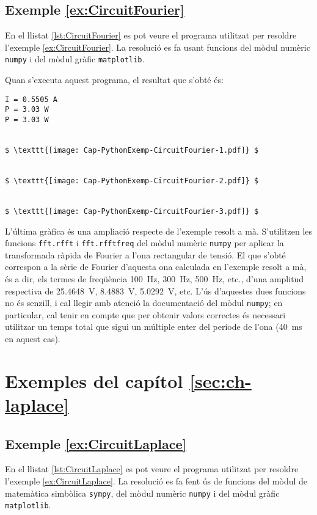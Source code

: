 \hypertarget{exemple:CircuitFourier}{\subsection{Exemple \ref*{ex:CircuitFourier} \CircuitFourier}}
En el llistat \vref{lst:CircuitFourier} es pot veure el programa utilitzat per resoldre l'exemple \vref{ex:CircuitFourier}. La resolució es fa usant funcions del mòdul numèric \texttt{numpy} i del mòdul gràfic  \texttt{matplotlib}.


Quan s'executa aquest programa, el resultat que s'obté és:
\lstset{
	language=,
	numbers=none,
	frame=none
}
\begin{lstlisting}[mathescape=true]
I = 0.5505 A
P = 3.03 W
P = 3.03 W


$ \texttt{[image: Cap-PythonExemp-CircuitFourier-1.pdf]} $


$ \texttt{[image: Cap-PythonExemp-CircuitFourier-2.pdf]} $


$ \texttt{[image: Cap-PythonExemp-CircuitFourier-3.pdf]} $
\end{lstlisting} 

L'última gràfica és una ampliació respecte de l'exemple resolt a mà. S'utilitzen les funcions \texttt{fft.rfft} i \texttt{fft.rfftfreq} del mòdul numèric \texttt{numpy} per aplicar la transformada ràpida de Fourier a l'ona rectangular de tensió. El que s'obté correspon a la sèrie de Fourier d'aquesta ona calculada en l'exemple resolt a  mà, és a dir, els termes de freqüència \qty{100}{Hz}, \qty{300}{Hz}, \qty{500}{Hz}, etc., d'una amplitud respectiva de \qty{25,4648}{V}, \qty{8,4883}{V}, \qty{5,0292}{V}, etc. L'ús d'aquestes dues funcions no és senzill, i cal llegir amb atenció la documentació del mòdul \texttt{numpy}; en particular, cal tenir en compte que per obtenir valors correctes és necessari utilitzar un temps total que sigui un múltiple enter del període de l'ona (\qty{40}{ms} en aquest cas).


\section{Exemples del capítol \ref*{sec:ch-laplace}}

\hypertarget{exemple:CircuitLaplace}{\subsection{Exemple \ref*{ex:CircuitLaplace} \CircuitLaplace}}
En el llistat \vref{lst:CircuitLaplace} es pot veure el programa utilitzat per resoldre l'exemple \vref{ex:CircuitLaplace}. La resolució es fa fent ús de funcions del mòdul de matemàtica simbòlica \texttt{sympy}, del mòdul numèric \texttt{numpy} i del mòdul gràfic  \texttt{matplotlib}. 

